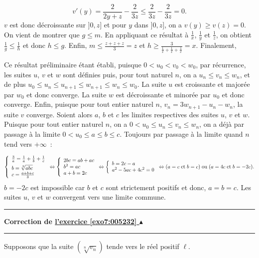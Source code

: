 \documentclass[11pt,a4paper]{article}
\newcounter{exo}
\newcommand{\correction}[1]{\hypertarget{cor7:#1}{}\label{cor7:#1}{\bf Correction de \hyperlink{exo7:#1}{l'exercice \ref{exo7:#1} $\blacktriangle$}}\vspace{1mm}\hrule\vspace{1mm}}
\newcommand{\fincorrection}{\vspace{1mm}\hrule\vspace*{7mm}}
\begin{document}
$$v'(y)=\frac{2}{2y+z}-\frac{2}{3z}\leq\frac{2}{3z}-\frac{2}{3z}=0.$$
$v$ est donc décroissante sur $]0,z]$ et pour $y$ dans $]0,z]$, on a $v(y)\geq v(z)=0$. On vient de montrer que $g\leq m$.
En appliquant ce résultat à $\frac{1}{x}$, $\frac{1}{y}$ et $\frac{1}{z}$, on obtient $\frac{1}{g}\leq\frac{1}{h}$ et donc $h\leq g$.
Enfin, $m\leq\frac{z+z+z}{3}=z$ et $h\geq\frac{3}{\frac{1}{x}+\frac{1}{x}+\frac{1}{x}}=x$. Finalement,

\begin{center}
\end{center}
Ce résultat préliminaire étant établi, puisque $0<u_0<v_0<w_0$, par récurrence, les suites $u$, $v$ et $w$ sont définies puis, pour tout naturel $n$, on a $u_n\leq v_n\leq w_n$, et de plus $u_0\leq u_n\leq u_{n+1}\leq w_{n+1}\leq w_n\leq w_0$.
La suite $u$ est croissante et majorée par $w_0$ et donc converge. La suite $w$ est décroissante et minorée par $u_0$ et donc converge. Enfin, puisque pour tout entier naturel $n$, $v_n=3w_{n+1}-u_n-w_n$, la suite $v$ converge.
Soient alors $a$, $b$ et $c$ les limites respectives des suites $u$, $v$ et $w$.
Puisque pour tout entier naturel $n$, on a $0<u_0\leq u_n\leq v_n\leq w_n$, on a déjà par passage à la limite $0<u_0\leq a\leq b\leq c$.
Toujours par passage à la limite quand $n$ tend vers $+\infty$~:

$$
\left\{
\begin{array}{l}
\frac{3}{a}=\frac{1}{a}+\frac{1}{b}+\frac{1}{c}\\
\rule{0mm}{5mm}b=\sqrt[3]{abc}\\
c=\frac{a+b+c}{3}
\end{array}
\right.
\Leftrightarrow
\left\{
\begin{array}{l}
2bc=ab+ac\\
b^2=ac\\
a+b=2c
\end{array}
\right.
\Leftrightarrow
\left\{
\begin{array}{l}
b=2c-a\\
a^2-5ac+4c^2=0\\
\end{array}
\right.
\Leftrightarrow(a=c\;\mbox{et}\;b=c)\;\mbox{ou}\;(a=4c\;\mbox{et}\;b=-2c).$$
$b=-2c$ est impossible car $b$ et $c$ sont strictement positifs et donc, $a=b=c$.
Les suites $u$, $v$ et $w$ convergent vers une limite commune.
\fincorrection
\correction{005232}
Supposons que la suite $(\sqrt[n]{v_n})$ tende vers le réel positif $\ell$.
\end{document}
